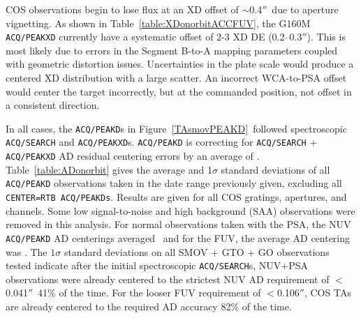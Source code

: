 \documentclass[12pt]{article}
\newcommand{\arcsec}{\ensuremath{''}}
\begin{document}
COS observations begin to lose flux at an XD offset of $\sim$0.4\arcsec\ due to aperture vignetting.
As shown in Table~\ref{table:XDonorbitACCFUV}, the G160M \texttt{ACQ/PEAKXD} currently have a systematic offset of 2-3 XD DE (0.2--0.3\arcsec).
This is most likely due to errors in the Segment B-to-A mapping parameters coupled with geometric distortion issues.
Uncertainties in the plate scale would produce a centered XD distribution with a large scatter.
An incorrect WCA-to-PSA offset would center the target incorrectly, but at the commanded position, not offset in a consistent direction.

In all cases, the \texttt{ACQ/PEAKD}s in Figure~\ref{TAsmovPEAKD}\, followed spectroscopic \texttt{ACQ/SEARCH}
and \texttt{ACQ/PEAKXD}s.
\texttt{ACQ/PEAKD} is correcting for \texttt{ACQ/SEARCH} + \texttt{ACQ/PEAKXD} AD residual centering errors by an average of \avgPEAKD.
Table~\ref{table:ADonorbit} gives the average and 1$\sigma$ standard deviations
of all \texttt{ACQ/PEAKD} observations taken in the date range previously given, excluding
all \texttt{CENTER=RTB \texttt{ACQ/PEAKD}s}.
Results are given for all COS gratings, apertures, and channels.
Some low signal-to-noise and high background (SAA) observations were removed in this analysis.
For normal observations taken with the PSA, the NUV \texttt{ACQ/PEAKD} AD centerings averaged \avgPEAKDpsaNUV\ and for the FUV, the average AD centering was \avgPEAKDpsaFUV.
The $1\sigma$ standard deviations on all SMOV + GTO + GO observations tested
indicate after the initial spectroscopic \texttt{ACQ/SEARCH}s, NUV+PSA observations were already
centered to the strictest NUV AD requirement of $<$ 0.041\arcsec\ 41\% of the time.
For the looser FUV requirement of $< $0.106\arcsec, COS TAs are already centered to the
required AD accuracy 82\% of the time.
\end{document}
